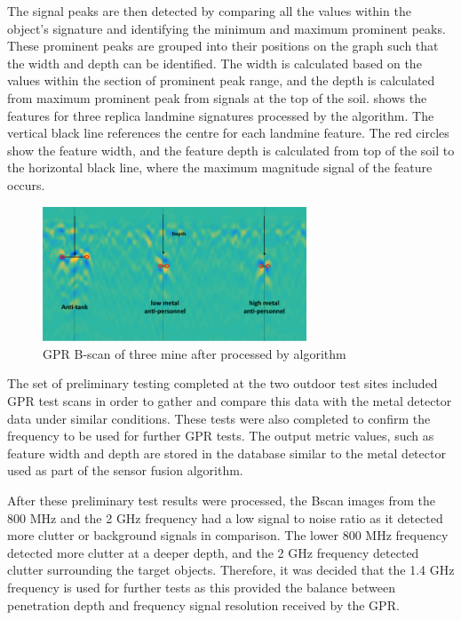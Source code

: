 \documentclass[main.tex]{subfiles}
\begin{document}
The signal peaks are then detected by comparing all the values within the object’s signature and identifying the minimum and maximum prominent peaks. These prominent peaks are grouped into their positions on the graph such that the width and depth can be identified. The width is calculated based on the values within the section of prominent peak range, and the depth is calculated from maximum prominent peak from signals at the top of the soil.  shows the features for three replica landmine signatures processed by the algorithm. The vertical black line references the centre for each landmine feature. The red circles show the feature width, and the feature depth is calculated from top of the soil to the horizontal black line, where the maximum magnitude signal of the feature occurs.

\begin{figure}[ht]
\includegraphics[width=0.7\textwidth]{4-DetailedDesign/GPRalg.PNG}
\centering
\caption{GPR B-scan of three mine after processed by algorithm}
\end{figure}

The set of preliminary testing completed at the two outdoor test sites included GPR test scans in order to gather and compare this data with the metal detector data under similar conditions. These tests were also completed to confirm the frequency to be used for further GPR tests. The output metric values, such as feature width and depth are stored in the database similar to the metal detector used as part of the sensor fusion algorithm. 

After these preliminary test results were processed, the Bscan images from the 800 MHz and the 2 GHz frequency had a low signal to noise ratio as it detected more clutter or background signals in comparison. The lower 800 MHz frequency detected more clutter at a deeper depth, and the 2 GHz frequency detected clutter surrounding the target objects. Therefore, it was decided that the 1.4 GHz frequency is used for further tests as this provided the balance between penetration depth and frequency signal resolution received by the GPR.
\end{document}
